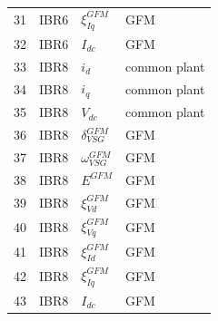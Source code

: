 \begin{longtable}{@{}r l l l@{}}
31 & IBR6 & $\xi_{Iq}^{GFM}$ & GFM \\ 
32 & IBR6 & $I_{dc}$ & GFM \\ 
33 & IBR8 & $i_d$ & common plant \\ 
34 & IBR8 & $i_q$ & common plant \\ 
35 & IBR8 & $V_{dc}$ & common plant \\ 
36 & IBR8 & $\delta_{VSG}^{GFM}$ & GFM \\ 
37 & IBR8 & $\omega_{VSG}^{GFM}$ & GFM \\ 
38 & IBR8 & $E^{GFM}$ & GFM \\ 
39 & IBR8 & $\xi_{Vd}^{GFM}$ & GFM \\ 
40 & IBR8 & $\xi_{Vq}^{GFM}$ & GFM \\ 
41 & IBR8 & $\xi_{Id}^{GFM}$ & GFM \\ 
42 & IBR8 & $\xi_{Iq}^{GFM}$ & GFM \\ 
43 & IBR8 & $I_{dc}$ & GFM \\ 
\bottomrule
\end{longtable}
